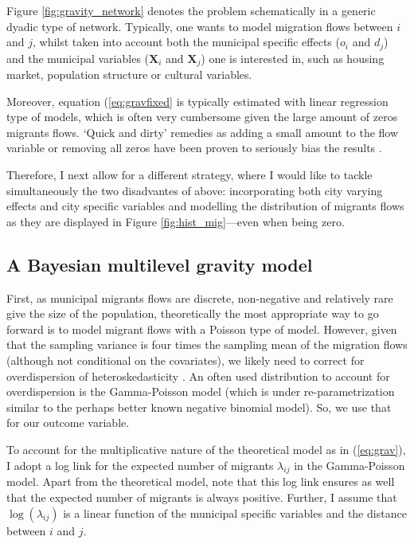 \documentclass[fleqn,10pt]{SelfArx} %
\begin{document}
        Figure \ref{fig:gravity_network} denotes the problem schematically in a generic dyadic type of network. Typically, one wants to model migration flows between $i$ and $j$, whilst taken into account both the municipal specific effects ($o_i$ and $d_j$) and the municipal variables ($\mathbf{X}_i$ and $\mathbf{X}_j$) one is interested  in, such as housing market, population structure or cultural variables. 
                  
        Moreover, equation
        (\ref{eq:gravfixed} is typically estimated with linear regression
        type of models, which is often very cumbersome given the large
        amount of zeros migrants flows. `Quick and dirty' remedies as adding a small amount to the flow variable or removing all zeros have been proven to seriously bias the results \citep{linders2006estimation, burger2009specification}.
        	

        Therefore, I next allow for a different strategy, where I
        would like to tackle simultaneously the two disadvantes of above:
        incorporating both city varying effects and city specific variables and
        modelling the distribution of migrants flows as they are
        displayed in Figure \ref{fig:hist_mig}---even when being zero.

        \subsection{A Bayesian multilevel gravity model}

        First, as municipal migrants flows are discrete, non-negative and
        relatively rare give the size of the population, theoretically the most
        appropriate way to go forward is to model migrant flows
        with a Poisson type of model. However, given that the sampling
        variance is four times the sampling mean of the migration
        flows (although not conditional on the covariates), we likely
        need to correct for overdispersion of heteroskedasticity
        \citep[][states that heteroskedasticity (rather than the
        presence of too many zeros) is responsible for the main
        source of bias within gravity models.]{silva2006log}. An often used distribution to
        account for overdispersion is the Gamma-Poisson model (which is under re-parametrization
        similar to the perhaps better known negative binomial model). So, we use that for our
        outcome variable.

        To account for the multiplicative nature of the theoretical
        model as in (\ref{eq:grav}), I adopt a log link for the
        expected number of migrants $\lambda_{ij}$ in the Gamma-Poisson model. 
        Apart from the theoretical model, note that this log link ensures 
        as well that the expected number of migrants is always positive. 
        Further, I assume that $\log(\lambda_{ij})$ is a linear function 
        of the municipal specific variables and the distance between $i$ and $j$.
\end{document}
